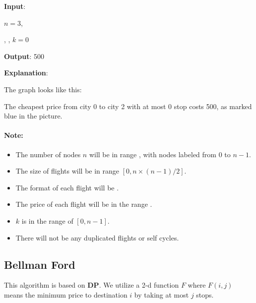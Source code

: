 \begin{flushleft}


\textbf{Input}: 

$ n = 3 $, 

, , $k = 0$

\textbf{Output}: 500

\textbf{Explanation}: 

The graph looks like this:

\begin{figure}[H]
\end{figure}

The cheapest price from city 0 to city 2 with at most 0 stop costs 500, as marked blue in the picture.

\end{flushleft}


\paragraph{Note:}

\begin{itemize}
\item The number of nodes $n$ will be in range \fcj{[1, 100]}, with nodes labeled from 0 to $n - 1$.
\item The size of flights will be in range $[0, n \times (n - 1) / 2]$.
\item The format of each flight will be .
\item The price of each flight will be in the range \fcj{[1, 10000]}.
\item $k$ is in the range of $[0, n - 1]$.
\item There will not be any duplicated flights or self cycles.
\end{itemize}

\subsection{Bellman Ford}
This algorithm is based on \textbf{DP}. We utilize a 2-d function $F$ where $F(i,j)$ means the minimum price to destination $i$ by taking at most $j$ stops. 

